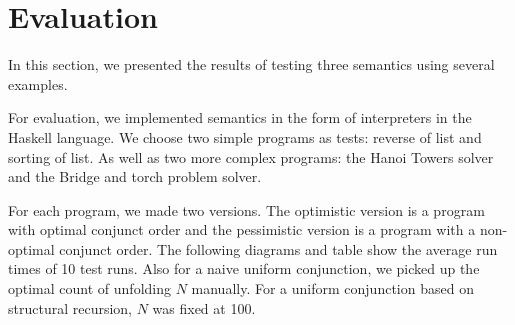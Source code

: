 \section{Evaluation}

In this section, we presented the results of testing three semantics using several examples.


For evaluation, we implemented semantics in the form of interpreters in the Haskell language. We choose two simple programs as tests: reverse of list and sorting of list. As well as two more complex programs: the Hanoi Towers solver and the Bridge and torch problem solver.

For each program, we made two versions. The optimistic version is a program with optimal conjunct order and the pessimistic version is a program with a non-optimal conjunct order. The following diagrams and table show the average run times of 10 test runs. Also for a naive uniform conjunction, we picked up the optimal count of unfolding $N$ manually. For a uniform conjunction based on structural recursion, $N$ was fixed at 100.

